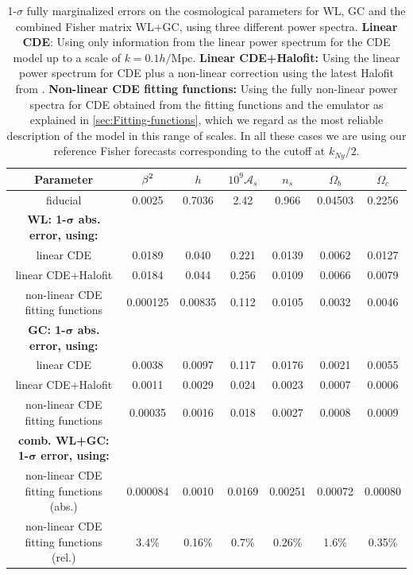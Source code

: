 \begin{table}
\tiny
\begin{centering}
\begin{tabular}{|c|c|c|c|c|c|c|}
\hline 
\textbf{Parameter}  & \textbf{$\text{\ensuremath{\beta}}^{2}$}  & $h$  & $10^{9}\mathcal{A}_{s}$  & $n_{s}$  & $\Omega_{b}$  & $\Omega_{c}$\tabularnewline
\hline 
fiducial  & 0.0025  & 0.7036  & 2.42  & 0.966  & 0.04503  & 0.2256\tabularnewline
\hline 
\textbf{WL: 1-$\mathbf{\sigma}$ abs. error, using:}  &  &  &  &  &  & \tabularnewline
\hline 
linear CDE  & 0.0189  & 0.040  & 0.221  & 0.0139  & 0.0062  & 0.0127\tabularnewline
linear CDE+Halofit  & 0.0184  & 0.044  & 0.256  & 0.0109  & 0.0066  & 0.0079\tabularnewline
non-linear CDE fitting functions  & 0.000125  & 0.00835  & 0.112  & 0.0105  & 0.0032  & 0.0046\tabularnewline
\hline 
\textbf{GC: 1-$\mathbf{\sigma}$ abs. error, using:}  &  &  &  &  &  & \tabularnewline
\hline 
linear CDE  & 0.0038  & 0.0097  & 0.117  & 0.0176  & 0.0021  & 0.0055\tabularnewline
linear CDE+Halofit  & 0.0011  & 0.0029  & 0.024  & 0.0023  & 0.0007  & 0.0006\tabularnewline
non-linear CDE fitting functions  & 0.00035  & 0.0016  & 0.018  & 0.0027  & 0.0008  & 0.0009\tabularnewline
\textbf{comb. WL+GC: 1-$\mathbf{\sigma}$ error, using:}  &  &  &  &  &  & \tabularnewline
\hline 
non-linear CDE fitting functions (abs.)  & 0.000084  & 0.0010  & 0.0169  & 0.00251  & 0.00072  & 0.00080 \tabularnewline
non-linear CDE fitting functions (rel.)  & 3.4\%  & 0.16\%  & 0.7\%  & 0.26\%  & 1.6\%  & 0.35\%\tabularnewline
\hline 
\end{tabular}
\par\end{centering}
\small
\caption[1$\sigma$ fully marginalized
errors for the CDE model, using WL, GC and the combined
Fisher matrix WL+GC, for three different power spectra.]{\label{tab:1-sigmaerrors-nl-WL-1-1} 1-$\sigma$ fully marginalized
errors on the cosmological parameters for WL, GC and the combined
Fisher matrix WL+GC, using three different power spectra. \textbf{Linear
CDE}: Using only information from the linear power spectrum for the
CDE model up to a scale of $k=0.1h/\mbox{Mpc}$. \textbf{Linear CDE+Halofit:
}Using the linear power spectrum for CDE plus a non-linear correction
using the latest Halofit from \cite{takahashi_revising_2012}. \textbf{Non-linear
CDE fitting functions: }Using the fully non-linear power spectra for
CDE obtained from the fitting functions and the emulator as explained
in \ref{sec:Fitting-functions}, which we regard as the most reliable
description of the model in this range of scales. In all these cases
we are using our reference Fisher forecasts corresponding to the cutoff
at $k_{Ny}/2$. }
\end{table}
\normalsize

